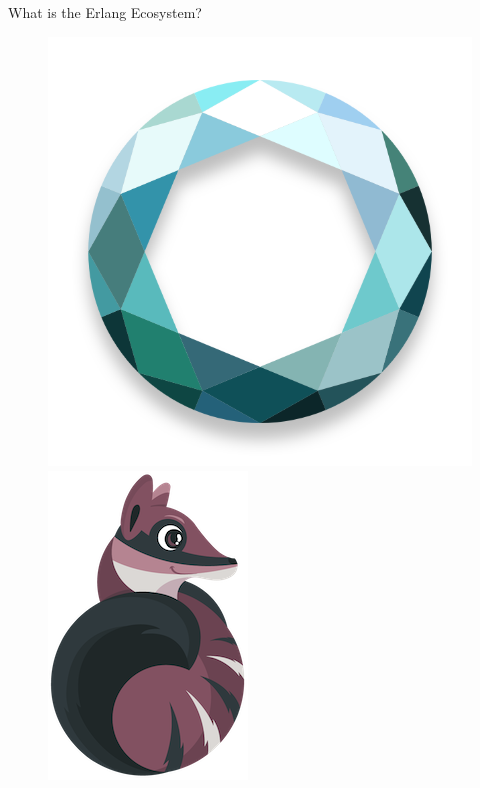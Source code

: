 \documentclass[
  ignorenonframetext,
  aspectratio=169]{beamer}
\begin{document}
\begin{frame}{What is the Erlang Ecosystem?}
\begin{figure}
\begin{minipage}{.24\textwidth}
  \includegraphics[width=.8\linewidth]{./img/oban-logo.png}
\end{minipage}
\begin{minipage}{.24\textwidth}
  \centering
  \includegraphics[width=.7\linewidth]{./img/nx_logo.png}
\end{minipage}

\end{figure}
\end{frame}
\end{document}
